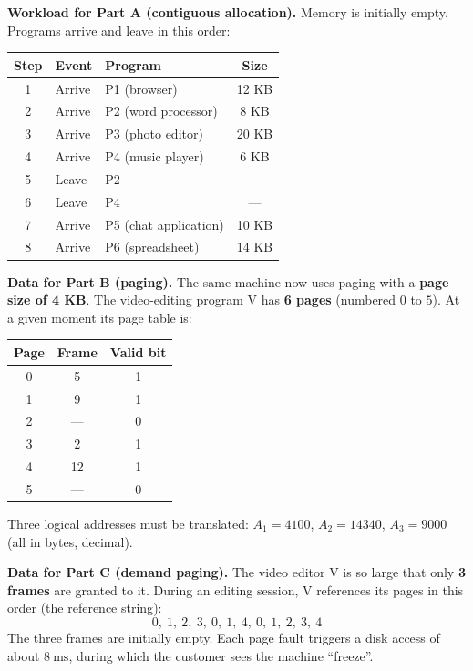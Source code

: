 \documentclass[11pt]{article}
\newcommand{\cle}[1]{{\popxbold\color{popdark}#1}}
\begin{document}
\textbf{Workload for Part A (contiguous allocation).} Memory is initially empty. Programs arrive and leave in this order:

\begin{center}
\begin{tabularx}{\linewidth}{|c|l|X|c|}
\hline
\rowcolor{popblueL} Step & Event & Program & Size \\
\hline
1 & Arrive & P1 (browser) & 12 KB \\
\hline
2 & Arrive & P2 (word processor) & 8 KB \\
\hline
3 & Arrive & P3 (photo editor) & 20 KB \\
\hline
4 & Arrive & P4 (music player) & 6 KB \\
\hline
5 & Leave & P2 & --- \\
\hline
6 & Leave & P4 & --- \\
\hline
7 & Arrive & P5 (chat application) & 10 KB \\
\hline
8 & Arrive & P6 (spreadsheet) & 14 KB \\
\hline
\end{tabularx}
\end{center}

\textbf{Data for Part B (paging).} The same machine now uses paging with a \textbf{page size of 4 KB}. The video-editing program V has \textbf{6 pages} (numbered $0$ to $5$). At a given moment its page table is:

\begin{center}
\begin{tabular}{|c|c|c|}
\hline
\rowcolor{popblueL} Page & Frame & Valid bit \\
\hline
0 & 5 & 1 \\
\hline
1 & 9 & 1 \\
\hline
2 & --- & 0 \\
\hline
3 & 2 & 1 \\
\hline
4 & 12 & 1 \\
\hline
5 & --- & 0 \\
\hline
\end{tabular}
\end{center}

Three logical addresses must be translated: $A_1 = 4100$, $A_2 = 14340$, $A_3 = 9000$ (all in bytes, decimal).

\textbf{Data for Part C (demand paging).} The video editor V is so large that only \textbf{3 frames} are granted to it. During an editing session, V references its pages in this order (the \cle{reference string}):
\[ 0,\ 1,\ 2,\ 3,\ 0,\ 1,\ 4,\ 0,\ 1,\ 2,\ 3,\ 4 \]
The three frames are initially empty. Each page fault triggers a disk access of about $8\ \mathrm{ms}$, during which the customer sees the machine ``freeze''.
\end{document}
